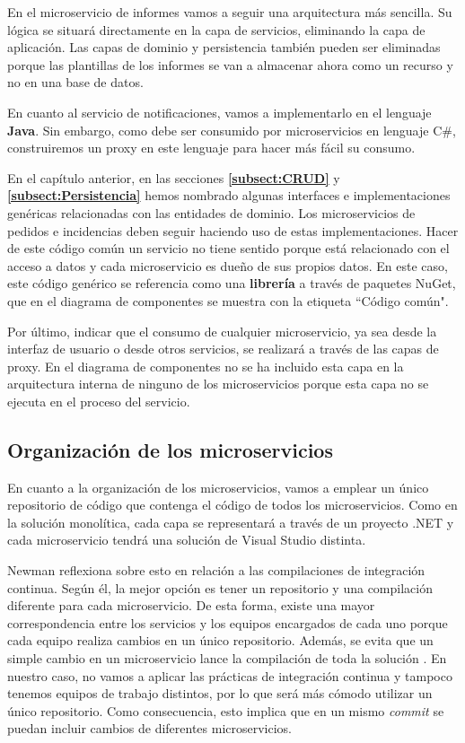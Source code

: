 \documentclass[11pt,spanish,listoffigures]{tfgetsinf}
\begin{document}
En el microservicio de informes vamos a seguir una arquitectura más sencilla. Su lógica se situará directamente en la capa de servicios, eliminando la capa de aplicación. Las capas de dominio y persistencia también pueden ser eliminadas porque las plantillas de los informes se van a almacenar ahora como un recurso y no en una base de datos. 

En cuanto al servicio de notificaciones, vamos a implementarlo en el lenguaje \textbf{Java}. Sin embargo, como debe ser consumido por microservicios en lenguaje C\#, construiremos un proxy en este lenguaje para hacer más fácil su consumo.

En el capítulo anterior, en las secciones \textbf{\ref{subsect:CRUD} } y \textbf{\ref{subsect:Persistencia} } hemos nombrado algunas interfaces e implementaciones genéricas relacionadas con las entidades de dominio. Los microservicios de pedidos e incidencias deben seguir haciendo uso de estas implementaciones. Hacer de este código común un servicio no tiene sentido porque está relacionado con el acceso a datos y cada microservicio es dueño de sus propios datos. En este caso, este código genérico se referencia como una \textbf{librería} a través de paquetes NuGet, que en el diagrama de componentes se muestra con la etiqueta ``Código común".

Por último, indicar que el consumo de cualquier microservicio, ya sea desde la interfaz de usuario o desde otros servicios, se realizará a través de las capas de proxy. En el diagrama de componentes no se ha incluido esta capa en la arquitectura interna de ninguno de los microservicios porque esta capa no se ejecuta en el proceso del servicio.

\subsection{Organización de los microservicios}

En cuanto a la organización de los microservicios, vamos a emplear un único repositorio de código que contenga el código de todos los microservicios. Como en la solución monolítica, cada capa se representará a través de un proyecto .NET y cada microservicio tendrá una solución de Visual Studio distinta.

Newman \cite{Newman2015a} reflexiona sobre esto en relación a las compilaciones de integración continua. Según él, la mejor opción es tener un repositorio y una compilación diferente para cada microservicio. De esta forma, existe una mayor correspondencia entre los servicios y los equipos encargados de cada uno porque cada equipo realiza cambios en un único repositorio. Además, se evita que un simple cambio en un microservicio lance la compilación de toda la solución \cite{Newman2015a}. En nuestro caso, no vamos a aplicar las prácticas de integración continua y tampoco tenemos equipos de trabajo distintos, por lo que será más cómodo utilizar un único repositorio. Como consecuencia, esto implica que en un mismo \textit{commit} se puedan incluir cambios de diferentes microservicios.
\end{document}
